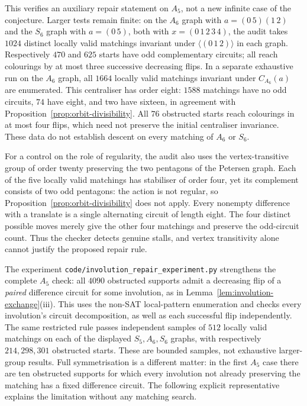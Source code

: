 \documentclass[11pt,a4paper]{article}
\theoremstyle{definition}
\theoremstyle{remark}
\begin{document}
This verifies an auxiliary repair statement on $A_5$, not a new infinite case of the conjecture.  Larger tests remain finite: on the $A_6$ graph with $a=(0\,5)(1\,2)$ and the $S_6$ graph with $a=(0\,5)$, both with $x=(0\,1\,2\,3\,4)$, the audit takes $1024$ distinct locally valid matchings invariant under $\langle(0\,1\,2)\rangle$ in each graph.  Respectively $470$ and $625$ starts have odd complementary circuits; all reach colourings by at most three successive decreasing flips.  In a separate exhaustive run on the $A_6$ graph, all $1664$ locally valid matchings invariant under $C_{A_6}(a)$ are enumerated.  This centraliser has order eight: $1588$ matchings have no odd circuits, $74$ have eight, and two have sixteen, in agreement with Proposition~\ref{prop:orbit-divisibility}.  All $76$ obstructed starts reach colourings in at most four flips, which need not preserve the initial centraliser invariance.  These data do not establish descent on every matching of $A_6$ or $S_6$.

For a control on the role of regularity, the audit also uses the vertex-transitive group of order twenty preserving the two pentagons of the Petersen graph.  Each of the five locally valid matchings has stabiliser of order four, yet its complement consists of two odd pentagons: the action is not regular, so Proposition~\ref{prop:orbit-divisibility} does not apply.  Every nonempty difference with a translate is a single alternating circuit of length eight.  The four distinct possible moves merely give the other four matchings and preserve the odd-circuit count.  Thus the checker detects genuine stalls, and vertex transitivity alone cannot justify the proposed repair rule.

The experiment \nolinkurl{code/involution_repair_experiment.py} strengthens the complete $A_5$ check: all $4090$ obstructed supports admit a decreasing flip of a \emph{paired} difference circuit for some involution, as in Lemma~\ref{lem:involution-exchange}\textup{(iii)}.  This uses the non-SAT local-pattern enumeration and checks every involution's circuit decomposition, as well as each successful flip independently.  The same restricted rule passes independent samples of $512$ locally valid matchings on each of the displayed $S_5,A_6,S_6$ graphs, with respectively $214,298,301$ obstructed starts.  These are bounded samples, not exhaustive larger-group results.  Full symmetrisation is a different matter: in the first $A_5$ case there are ten obstructed supports for which every involution not already preserving the matching has a fixed difference circuit.  The following explicit representative explains the limitation without any matching search.
\end{document}
